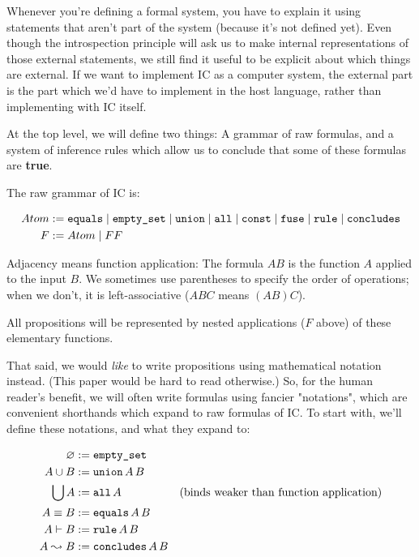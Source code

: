 \documentclass{article}
\begin{document}
  Whenever you're defining a formal system, you have to explain it using statements that aren't part of the system (because it's not defined yet).
  Even though the introspection principle will ask us to make internal representations of those external statements, we still find it useful to be explicit about which things are external.
  If we want to implement IC as a computer system, the external part is the part which we'd have to implement in the host language, rather than implementing with IC itself.
  
  At the top level, we will define two things: A grammar of raw formulas, and a system of inference rules which allow us to conclude that some of these formulas are \textbf{true}.
  
  The raw grammar of IC is:
  
  \begin{align*}
    Atom &:= \operatorname{\texttt{equals}} \mid \operatorname{\texttt{empty\_set}} \mid \operatorname{\texttt{union}} \mid \operatorname{\texttt{all}} \mid \operatorname{\texttt{const}} \mid \operatorname{\texttt{fuse}} \mid \operatorname{\texttt{rule}} \mid \operatorname{\texttt{concludes}}\\
    F &:= Atom \mid FF \\
  \end{align*}
  
  Adjacency means function application: The formula $AB$ is the function $A$ applied to the input $B$. We sometimes use parentheses to specify the order of operations; when we don't, it is left-associative ($ABC$ means $(AB)C$).
  
  All propositions will be represented by nested applications ($F$ above) of these elementary functions.
  
  That said, we would \emph{like} to write propositions using mathematical notation instead.
  (This paper would be hard to read otherwise.)
  So, for the human reader's benefit, we will often write formulas using fancier "notations", which are convenient shorthands which expand to raw formulas of IC.
  To start with, we'll define these notations, and what they expand to:
  
  \begin{align*}
    \varnothing &:= \operatorname{\texttt{empty\_set}}\\
    A \cup B &:= \operatorname{\texttt{union}} A\, B\\
    \bigcup A &:= \operatorname{\texttt{all}} A & (\text{binds weaker than function application})\\
    A \equiv B &:= \operatorname{\texttt{equals}} A\, B\\
    A \vdash B &:= \operatorname{\texttt{rule}} A\, B\\
    A \leadsto B &:= \operatorname{\texttt{concludes}} A\, B\\
  \end{align*}
  
\end{document}
